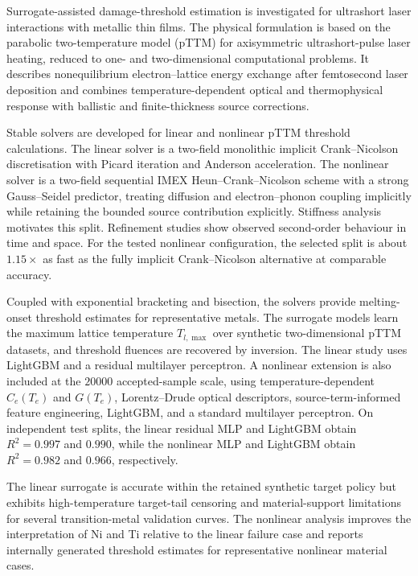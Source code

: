 Surrogate-assisted damage-threshold estimation is investigated for ultrashort laser interactions with metallic thin films. The physical formulation is based on the parabolic two-temperature model (pTTM) for axisymmetric ultrashort-pulse laser heating, reduced to one- and two-dimensional computational problems. It describes nonequilibrium electron--lattice energy exchange after femtosecond laser deposition and combines temperature-dependent optical and thermophysical response with ballistic and finite-thickness source corrections.

Stable solvers are developed for linear and nonlinear pTTM threshold calculations. The linear solver is a two-field monolithic implicit Crank--Nicolson discretisation with Picard iteration and Anderson acceleration. The nonlinear solver is a two-field sequential IMEX Heun--Crank--Nicolson scheme with a strong Gauss--Seidel predictor, treating diffusion and electron--phonon coupling implicitly while retaining the bounded source contribution explicitly. Stiffness analysis motivates this split. Refinement studies show observed second-order behaviour in time and space. For the tested nonlinear configuration, the selected split is about \(1.15\times\) as fast as the fully implicit Crank--Nicolson alternative at comparable accuracy.

Coupled with exponential bracketing and bisection, the solvers provide melting-onset threshold estimates for representative metals. The surrogate models learn the maximum lattice temperature \(T_{l,\max}\) over synthetic two-dimensional pTTM datasets, and threshold fluences are recovered by inversion. The linear study uses LightGBM and a residual multilayer perceptron. A nonlinear extension is also included at the \(\num{20000}\) accepted-sample scale, using temperature-dependent \(C_e(T_e)\) and \(G(T_e)\), Lorentz--Drude optical descriptors, source-term-informed feature engineering, LightGBM, and a standard multilayer perceptron. On independent test splits, the linear residual MLP and LightGBM obtain \(R^2=0.997\) and \(0.990\), while the nonlinear MLP and LightGBM obtain \(R^2=0.982\) and \(0.966\), respectively.

The linear surrogate is accurate within the retained synthetic target policy but exhibits high-temperature target-tail censoring and material-support limitations for several transition-metal validation curves. The nonlinear analysis improves the interpretation of Ni and Ti relative to the linear failure case and reports internally generated threshold estimates for representative nonlinear material cases.
